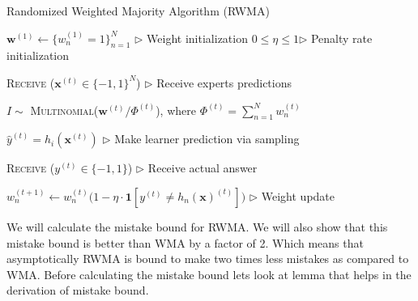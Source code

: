 \documentclass[11pt]{article}
\begin{document}
\begin{algorithm}[H]
\caption{Randomized Weighted Majority Algorithm (RWMA)}
\label{algo:rwma}
\begin{algorithmic}[1]
\STATE $\textbf{w}^{(1)} \leftarrow \{w_n^{(1)}=1\}_{n=1}^N$ \hfill $\triangleright$ Weight initialization
\STATE $0\le\eta\le1$\hfill $\triangleright$ Penalty rate initialization

\STATE \textsc{Receive} ($\textbf{x}^{(t)}\in\{-1, 1\}^N$) \hfill $\triangleright$ Receive experts predictions

\STATE $I\sim$ \textsc{Multinomial}($\textbf{w}^{(t)}/\Phi^{(t)}$), where $\Phi^{(t)}=\sum_{n=1}^Nw_n^{(t)}$

\STATE $\hat{y}^{(t)}=h_i(\textbf{x}^{(t)})$ \hfill $\triangleright$ Make learner prediction via sampling

\STATE \textsc{Receive} ($y^{(t)}\in\{-1, 1\}$) \hfill $\triangleright$ Receive actual answer

\STATE $w_n^{(t+1)}\leftarrow w_n^{(t)}\big(1-\eta\cdot\textbf{1}[y^{(t)}\neq h_n(\textbf{x})^{(t)}]\big)$ \hfill $\triangleright$ Weight update

\ENDFOR
\end{algorithmic}
\end{algorithm}

We will calculate the mistake bound for RWMA. We will also show that this mistake bound is better than WMA by a factor of 2. Which means that asymptotically RWMA is bound to make two times less mistakes as compared to WMA. Before calculating the mistake bound lets look at lemma that helps in the derivation of mistake bound.
\end{document}
